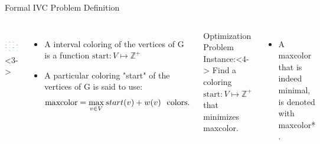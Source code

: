 \begin{frame}{Formal IVC Problem Definition}
  \begin{columns}
        \centering
         \\
        \null
        \includegraphics[width=1\textwidth]{figures/ICV1.pdf}<3->
    \begin{itemize}
      \item<1-> A interval coloring of the vertices of G is a function $\text{start} : V \mapsto \mathbb{Z^+}$
      \null
      \vfill
      \null
      \item<2-> A particular coloring "start" of the vertices of G is said to use:
      \[ \text{maxcolor}= \max_{v \in V} start(v) + w(v) \hspace{0.25cm}  \text{colors.}\]
    \end{itemize}
      \begin{block}{Optimization Problem Instance:}<4->
        Find a coloring $\text{start}:V \mapsto \mathbb{Z}^+$ that minimizes maxcolor. \\
      \end{block}
      \null
      \vfill
      \null
    \begin{itemize}
      \item<4-> A maxcolor that is indeed minimal, is denoted with maxcolor* .
    \end{itemize}

  \end{columns}
\end{frame}